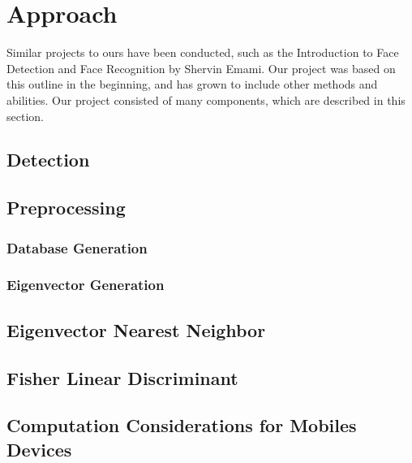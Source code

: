 
\section{Approach} %

Similar projects to ours have been conducted, such as the Introduction
to Face Detection and Face Recognition by Shervin Emami\cite{Emami}.
Our project was based on this outline in the beginning, and has grown
to include other methods and abilities.  Our project consisted of many
components, which are described in this section.



\subsection{Detection}



\subsection{Preprocessing}


\subsubsection{Database Generation}
\subsubsection{Eigenvector Generation}



\subsection{Eigenvector Nearest Neighbor}



\subsection{Fisher Linear Discriminant}




\subsection{Computation Considerations for Mobiles Devices}


